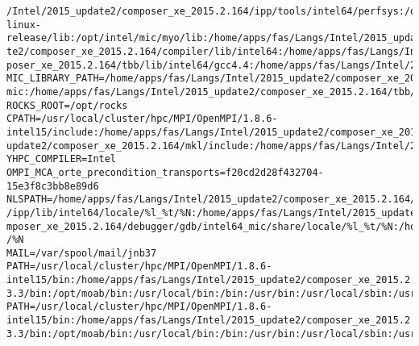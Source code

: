 \documentclass[11pt]{article}
\begin{document}
\begin{verbatim}
/Intel/2015_update2/composer_xe_2015.2.164/ipp/tools/intel64/perfsys:/opt/intel/mic/coi/host-linux-release/lib:/opt/intel/mic/myo/lib:/home/apps/fas/Langs/Intel/2015_upda
te2/composer_xe_2015.2.164/compiler/lib/intel64:/home/apps/fas/Langs/Intel/2015_update2/composer_xe_2015.2.164/mkl/lib/intel64:/home/apps/fas/Langs/Intel/2015_update2/com
poser_xe_2015.2.164/tbb/lib/intel64/gcc4.4:/home/apps/fas/Langs/Intel/2015_update2/composer_xe_2015.2.164/debugger/ipt/intel64/lib
MIC_LIBRARY_PATH=/home/apps/fas/Langs/Intel/2015_update2/composer_xe_2015.2.164/compiler/lib/mic:/home/apps/fas/Langs/Intel/2015_update2/composer_xe_2015.2.164/mpirt/lib/
mic:/home/apps/fas/Langs/Intel/2015_update2/composer_xe_2015.2.164/tbb/lib/mic
ROCKS_ROOT=/opt/rocks
CPATH=/usr/local/cluster/hpc/MPI/OpenMPI/1.8.6-intel15/include:/home/apps/fas/Langs/Intel/2015_update2/composer_xe_2015.2.164/ipp/include:/home/apps/fas/Langs/Intel/2015_
update2/composer_xe_2015.2.164/mkl/include:/home/apps/fas/Langs/Intel/2015_update2/composer_xe_2015.2.164/tbb/include
YHPC_COMPILER=Intel
OMPI_MCA_orte_precondition_transports=f20cd2d28f432704-15e3f8c3bb8e89d6
NLSPATH=/home/apps/fas/Langs/Intel/2015_update2/composer_xe_2015.2.164/compiler/lib/intel64/locale/%l_%t/%N:/home/apps/fas/Langs/Intel/2015_update2/composer_xe_2015.2.164
/ipp/lib/intel64/locale/%l_%t/%N:/home/apps/fas/Langs/Intel/2015_update2/composer_xe_2015.2.164/mkl/lib/intel64/locale/%l_%t/%N:/home/apps/fas/Langs/Intel/2015_update2/co
mposer_xe_2015.2.164/debugger/gdb/intel64_mic/share/locale/%l_%t/%N:/home/apps/fas/Langs/Intel/2015_update2/composer_xe_2015.2.164/debugger/gdb/intel64/share/locale/%l_%t
/%N
MAIL=/var/spool/mail/jnb37
PATH=/usr/local/cluster/hpc/MPI/OpenMPI/1.8.6-intel15/bin:/home/apps/fas/Langs/Intel/2015_update2/composer_xe_2015.2.164/bin/intel64:/home/apps/fas/Langs/Intel/2015_update2/composer_xe_2015.2.164/mpirt/bin/intel64:/home/apps/fas/Langs/Intel/2015_update2/composer_xe_2015.2.164/debugger/gdb/intel64_mic/bin:/home/apps/fas/Langs/Intel/2015_update2/composer_xe_2015.2.164/debugger/gdb/intel64/bin:/home/apps/fas/Modules:/usr/lib64/qt-3.3/bin:/opt/moab/bin:/usr/local/bin:/bin:/usr/bin:/usr/local/sbin:/usr/sbin:/s
PATH=/usr/local/cluster/hpc/MPI/OpenMPI/1.8.6-intel15/bin:/home/apps/fas/Langs/Intel/2015_update2/composer_xe_2015.2.164/bin/intel64:/home/apps/fas/Langs/Intel/2015_update2/composer_xe_2015.2.164/mpirt/bin/intel64:/home/apps/fas/Langs/Intel/2015_update2/composer_xe_2015.2.164/debugger/gdb/intel64_mic/bin:/home/apps/fas/Langs/Intel/2015_update2/composer_xe_2015.2.164/debugger/gdb/intel64/bin:/home/apps/fas/Modules:/usr/lib64/qt-3.3/bin:/opt/moab/bin:/usr/local/bin:/bin:/usr/bin:/usr/local/sbin:/usr/sbin:/sbin:/usr/java/latest/bin:/opt/rocks/bin:/opt/rocks/sbin:/home/apps/bin:/home/fas/cpsc424/jnb37/bin

\end{verbatim}
\end{document}
